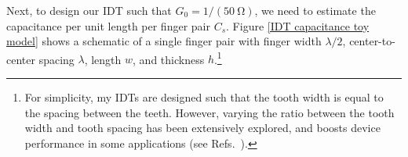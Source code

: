 \documentclass{beavtex_dub_edit}
\begin{document}
Next, to design our IDT such that $G_0 = 1/(\SI{50}{\ohm})$, we need to estimate the capacitance per unit length per finger pair $C_s$. Figure \ref{IDT capacitance toy model} shows a schematic of a single finger pair with finger width $\lambda/2$, center-to-center spacing $\lambda$, length $w$, and thickness $h$.\footnote{For simplicity, my IDTs are designed such that the tooth width is equal to the spacing between the teeth. However, varying the ratio between the tooth width and tooth spacing has been extensively explored, and boosts device performance in some applications (see Refs.\ \cite{datta_surface_1986, campbell_surface_1989}).}



\end{document}
